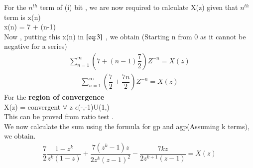 \documentclass[journal,12pt,twocolumn]{IEEEtran}
\theoremstyle{remark}
\begin{document}
\begin{enumerate}
For the $n^{th}$ term of (i) bit , we are now required to calculate X(z) given that $n^{th}$ term is x(n)\\
x(n) = 7 + (n-1)\\

Now , putting this x(n) in $\eqref{eq:3}$ , we obtain (Starting n from 0 as it cannot be negative for a series)\\
\begin{align}
     \sum_{n=1}^{\infty}(7 + (n-1)\dfrac{7}{2})Z^{-n} =X(z)
\end{align}
\begin{align}
\sum_{n=1}^{\infty}(\dfrac{7}{2} + \dfrac{7n}{2})Z^{-n} =X(z)
\end{align}
For the \textbf{region of convergence}\\
X(z) = convergent $\forall$ z $\epsilon$(-\infty,-1)U(1,\infty)
\\

This can be proved from ratio test . \\
We now calculate the sum using the formula for gp and agp(Assuming k terms), we obtain.\\
\begin{align}
    \dfrac{7}{2}\dfrac{1-z^k}{z^k(1-z)}+\dfrac{7(z^k-1)z}{2z^k(z-1)^2}-\dfrac{7kz}{2z^{k+1}(z-1)}=X(z)
\end{align}

 






\end{enumerate}



 

 
\end{document}
